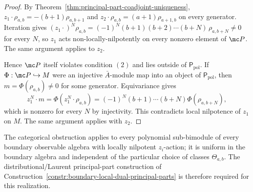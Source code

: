 \documentclass[11pt]{memoir}
\begin{document}
\begin{proof}
  By Theorem~\ref{thm:principal-part-coadjoint-uniqueness},
  $z_1\cdot\rho_{a,b}=-(b+1)\rho_{a,b+1}$ and
  $z_2\cdot\rho_{a,b}=(a+1)\rho_{a+1,b}$ on every generator. Iteration
  gives
  $(z_1\cdot)^N\rho_{a,b}=(-1)^N(b+1)(b+2)\cdots(b+N)\,\rho_{a,b+N}\neq0$
  for every $N$, so $z_1$ acts non-locally-nilpotently on every nonzero
  element of $\mc P$. The same argument applies to $z_2$.

  Hence \(\mc P\) itself violates condition \((2)\) and lies outside
  of \(\mathsf P_{\mathrm{pol}}\).  If
  \(\Phi:\mc P\hookrightarrow M\) were an injective
  \(\bar A\)-module map into an object of \(\mathsf P_{\mathrm{pol}}\),
  then \(m=\Phi(\rho_{a,b})\neq0\) for some generator.  Equivariance gives
  \[
    z_1^N\cdot m
      =
    \Phi(z_1^N\cdot\rho_{a,b})
      =
    (-1)^N(b+1)\cdots(b+N)\Phi(\rho_{a,b+N}),
  \]
  which is nonzero for every \(N\) by injectivity.  This contradicts
  local nilpotence of \(z_1\) on \(M\).  The same argument applies with
  \(z_2\).
\end{proof}

\begin{rmk}\label{rmk:polynomial-categorical-action-obstruction}
  The categorical obstruction applies to every polynomial sub-bimodule of
  every boundary observable algebra with locally nilpotent
  $z_i$-action; it is uniform in the boundary algebra and independent of
  the particular choice of classes $\Theta_{a,b}$. The
  distributional/Laurent principal-part construction of
  Construction~\ref{constr:boundary-local-dual-principal-parts} is
  therefore required for this realization.
\end{rmk}
\end{document}

